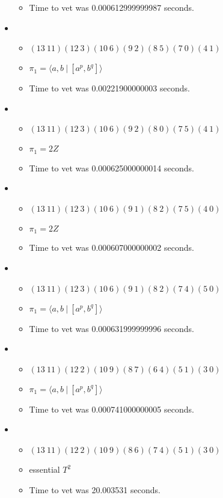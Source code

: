 \documentclass{article}
\begin{document}
\begin{itemize}
\begin{itemize}
      \item Time to vet was 0.000612999999987 seconds.
\end{itemize}
\item \begin{itemize}
      \item $(13\ 11)(12\ 3)(10\ 6)(9\ 2)(8\ 5)(7\ 0)(4\ 1)$
      \item $\pi_1 = \langle a,b\ |\ [a^p,b^q]\rangle$
      \item Time to vet was 0.00221900000003 seconds.
\end{itemize}
\item \begin{itemize}
      \item $(13\ 11)(12\ 3)(10\ 6)(9\ 2)(8\ 0)(7\ 5)(4\ 1)$
      \item $\pi_1 =2 Z$
      \item Time to vet was 0.000625000000014 seconds.
\end{itemize}
\item \begin{itemize}
      \item $(13\ 11)(12\ 3)(10\ 6)(9\ 1)(8\ 2)(7\ 5)(4\ 0)$
      \item $\pi_1 =2 Z$
      \item Time to vet was 0.000607000000002 seconds.
\end{itemize}
\item \begin{itemize}
      \item $(13\ 11)(12\ 3)(10\ 6)(9\ 1)(8\ 2)(7\ 4)(5\ 0)$
      \item $\pi_1 = \langle a,b\ |\ [a^p,b^q]\rangle$
      \item Time to vet was 0.000631999999996 seconds.
\end{itemize}
\item \begin{itemize}
      \item $(13\ 11)(12\ 2)(10\ 9)(8\ 7)(6\ 4)(5\ 1)(3\ 0)$
      \item $\pi_1 = \langle a,b\ |\ [a^p,b^q]\rangle$
      \item Time to vet was 0.000741000000005 seconds.
\end{itemize}
\item \begin{itemize}
      \item $(13\ 11)(12\ 2)(10\ 9)(8\ 6)(7\ 4)(5\ 1)(3\ 0)$
      \item essential $T^2$
      \item Time to vet was 20.003531 seconds.

\end{itemize}
\end{itemize}
\end{document}

